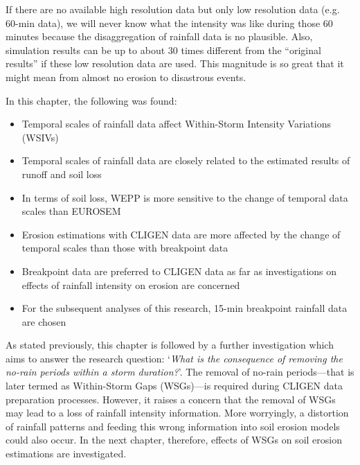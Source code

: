 If there are no available high resolution data but only low resolution
data (e.g. 60-min data), we will never know what the intensity was like
during those 60 minutes because the disaggregation of rainfall data is no
plausible. Also, simulation results can be up to about 30 times different from
the ``original results'' if these low resolution data are used. This magnitude
is so great that it might mean from almost no erosion to disastrous events.

In this chapter, the following was found:
\begin{itemize}
  \item Temporal scales of rainfall data affect Within-Storm Intensity
Variations (WSIVs)
  \item Temporal scales of rainfall data are closely related to the estimated
results of runoff and soil loss
  \item In terms of soil loss, WEPP is more sensitive to the change of temporal
data scales than EUROSEM
  \item Erosion estimations with CLIGEN data are more affected by the change of
temporal scales than those with breakpoint data
  \item Breakpoint data are preferred to CLIGEN data as far as investigations
on effects of rainfall intensity on erosion are concerned
  \item For the subsequent analyses of this research, 15-min breakpoint rainfall
data are chosen
\end{itemize}


As stated previously, this chapter is followed by a further investigation which
aims to answer the research question: `\textit{What is the consequence of
removing the no-rain periods within a storm duration?}'. The removal of no-rain
periods---that is later termed as Within-Storm Gaps (WSGs)---is required during
CLIGEN data preparation processes. However, it raises a concern that the removal
of WSGs may lead to a loss of rainfall intensity information. More worryingly,
a distortion of rainfall patterns and feeding this wrong information into soil
erosion models could also occur. In the next chapter, therefore, effects of
WSGs on soil erosion estimations are investigated.



